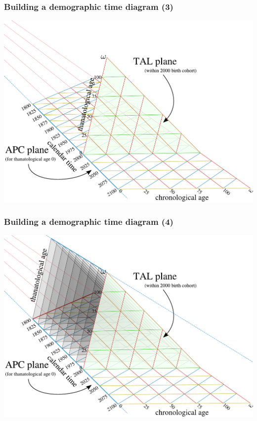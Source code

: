 \documentclass[20pt]{beamer}
\begin{document}
\begin{frame}
\frametitle{Building a demographic time diagram (3)}
\vspace{-1em}
\begin{center}
\includegraphics[scale=.8]{Figures/buildTAL3.pdf}
\end{center}
\end{frame}
\begin{frame}
\frametitle{Building a demographic time diagram (4)}
\vspace{-1em}
\begin{center}
\includegraphics[scale=.8]{Figures/buildTAL4.pdf}
\end{center}
\end{frame}
\end{document}
